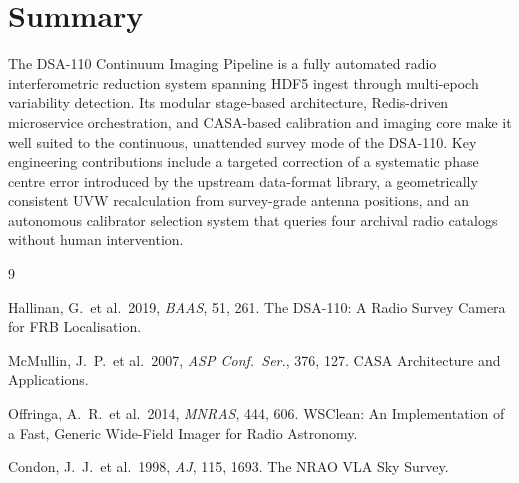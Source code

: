 \documentclass[12pt,a4paper]{article}
\begin{document}
\section{Summary}

The DSA-110 Continuum Imaging Pipeline is a fully automated radio
interferometric reduction system spanning HDF5 ingest through multi-epoch
variability detection.  Its modular stage-based architecture, Redis-driven
microservice orchestration, and CASA-based calibration and imaging core make it
well suited to the continuous, unattended survey mode of the DSA-110.  Key
engineering contributions include a targeted correction of a systematic phase
centre error introduced by the upstream data-format library, a geometrically
consistent UVW recalculation from survey-grade antenna positions, and an
autonomous calibrator selection system that queries four archival radio
catalogs without human intervention.

\begin{thebibliography}{9}

  Hallinan, G.\ et al.\ 2019,
  \textit{BAAS}, 51, 261.
  The DSA-110: A Radio Survey Camera for FRB Localisation.

  McMullin, J.~P.\ et al.\ 2007,
  \textit{ASP Conf.\ Ser.}, 376, 127.
  CASA Architecture and Applications.

  Offringa, A.~R.\ et al.\ 2014,
  \textit{MNRAS}, 444, 606.
  WSClean: An Implementation of a Fast, Generic Wide-Field Imager for
  Radio Astronomy.

  Condon, J.~J.\ et al.\ 1998,
  \textit{AJ}, 115, 1693.
  The NRAO VLA Sky Survey.

\end{thebibliography}
\end{document}
